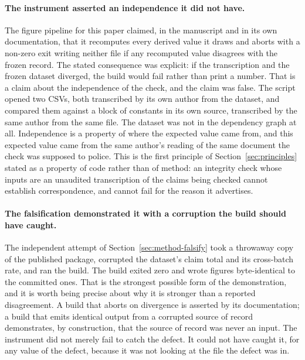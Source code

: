\documentclass[sigconf,review]{acmart}
\begin{document}
\paragraph{The instrument asserted an independence it did not have.} The figure
pipeline for this paper claimed, in the manuscript and in its own
documentation, that it recomputes every derived value it draws and aborts with
a non-zero exit writing neither file if any recomputed value disagrees with the
frozen record. The stated consequence was explicit: if the transcription and
the frozen dataset diverged, the build would fail rather than print a number.
That is a claim about the independence of the check, and the claim was false.
The script opened two CSVs, both transcribed by its own author from the dataset,
and compared them against a block of constants in its own source, transcribed by
the same author from the same file. The dataset was not in the dependency graph
at all. Independence is a property of where the expected value came from, and
this expected value came from the same author's reading of the same document
the check was supposed to police. This is the first principle of
Section~\ref{sec:principles} stated as a property of code rather than of
method: an integrity check whose inputs are an unaudited transcription of the
claims being checked cannot establish correspondence, and cannot fail for the
reason it advertises.

\paragraph{The falsification demonstrated it with a corruption the build should
have caught.} The independent attempt of Section~\ref{sec:method-falsify} took
a throwaway copy of the published package, corrupted the dataset's claim total
and its cross-batch rate, and ran the build. The build exited zero and wrote
figures byte-identical to the committed ones. That is the strongest possible
form of the demonstration, and it is worth being precise about why it is
stronger than a reported disagreement. A build that aborts on divergence is
asserted by its documentation; a build that emits identical output from a
corrupted source of record demonstrates, by construction, that the source of
record was never an input. The instrument did not merely fail to catch the
defect. It could not have caught it, for any value of the defect, because it
was not looking at the file the defect was in.
\end{document}
